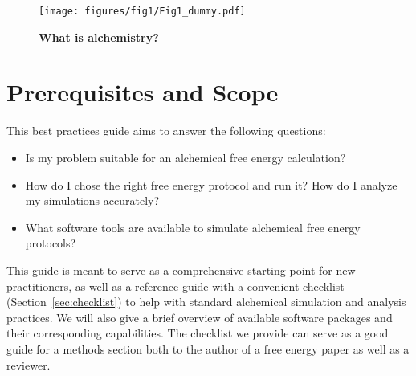 \documentclass[9pt,bestpractices]{livecoms}
\begin{document}
\begin{figure}
    \texttt{[image: figures/fig1/Fig1\_dummy.pdf]}
    \caption{{\bf What is alchemistry?}
    }
    \label{fig:illustrative-alchemical-transformation}
\end{figure}


\section{Prerequisites and Scope}
\label{sec:pre}


This best practices guide aims to answer the following questions:
\begin{itemize}
    \item Is my problem suitable for an alchemical free energy calculation? 
    \item How do I chose the right free energy protocol and run it? How do I analyze my simulations accurately? 
    \item What software tools are available to simulate alchemical free energy protocols? 
\end{itemize}
This guide is meant to serve as a comprehensive starting point for new practitioners, as well as a reference guide with a convenient checklist (Section~\ref{sec:checklist}) to help with standard alchemical simulation and analysis practices. 
We will also give a brief overview of available software packages and their corresponding capabilities.
The checklist we provide can serve as a good guide for a methods section both to the author of a free energy paper as well as a reviewer. 
\end{document}
